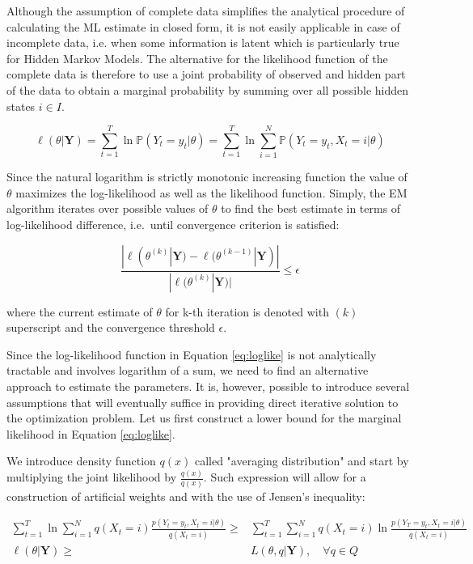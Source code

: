 Although the assumption of complete data simplifies the analytical procedure of calculating the ML estimate in closed form, 
it is not easily applicable in case of incomplete data, i.e. when some information is latent which is particularly true for Hidden Markov Models. 
The alternative for the likelihood function of the complete data is therefore to use a joint probability of observed and hidden part of the data to 
obtain a marginal probability by summing over all possible hidden states $i \in I$. 

\begin{equation} \label{eq:loglike}
\ell(\theta|\textbf{Y}) = \sum_{t=1}^{T} \ln \mathbb{P}(Y_t= y_t|\theta) = \sum_{t=1}^{T} \ln \sum\limits_{i=1}^N \mathbb{P}(Y_t= y_t,X_t=i|\theta)
\end{equation}

Since the natural logarithm is strictly monotonic increasing function the value of $\theta$ maximizes the log-likelihood as well as the 
likelihood function. Simply, the EM algorithm iterates over possible values of $\theta$ to find the best estimate in terms of log-likelihood difference, 
i.e.\ until convergence criterion is satisfied:

\begin{equation} \label{eq:conv}
\frac{|\ell(\theta^{(k)}|\textbf{Y}) - \ell(\theta^{(k-1)}|\textbf{Y})|}{|\ell(\theta^{(k)}|\textbf{Y})|} \leq \epsilon 
\end{equation}

where the current estimate of $\theta$ for k-th iteration is denoted with $(k)$ superscript 
and the convergence threshold $\epsilon$. 

Since the log-likelihood function in Equation \ref{eq:loglike} is not analytically tractable and involves logarithm of a sum,
we need to find an alternative approach to estimate the parameters.
It is, however, possible to introduce several assumptions that will eventually suffice in providing 
direct iterative solution to the optimization problem. Let us first construct a lower bound for the 
marginal likelihood in Equation \ref{eq:loglike}. 

We introduce density function $q(x)$ called "averaging distribution" and start by multiplying 
the joint likelihood by $\frac{q(x)}{q(x)}$. Such expression will allow for a construction of 
artificial weights and with the use of Jensen's inequality:

\begin{align}
    \sum_{t=1}^{T} \ln \sum_{i=1}^{N} q(X_t = i) \frac{p(Y_t=y_t, X_t = i|\theta)}{q(X_t = i)} \geq& \sum_{t=1}^{T} \sum_{i=1}^{N} q(X_t = i) \ln \frac{p(Y_T =y_t, X_t = i|\theta)}{q(X_t = i)} \\
    \ell(\theta|\textbf{Y}) \geq& L(\theta,q|\textbf{Y}), \quad \forall q \in Q
\end{align}


